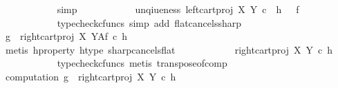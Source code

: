 \begin{isabellebody}
\ \ \ \ \ \ \ \ \ \ \isamarkupfalse%
\ simp\isanewline
\ \ \ \ \ \ \ \ \isamarkupfalse%
\ \isamarkupfalse%
\ unqiueness{}{\isacharcolon}{\kern0pt}\ {\isachardoublequoteopen}{\isacharparenleft}{\kern0pt}left{\isacharunderscore}{\kern0pt}cart{\isacharunderscore}{\kern0pt}proj\ X\ Y{\isacharparenright}{\kern0pt}\ {\isasymcirc}\isactrlsub c\ \ h\isactrlsup {\isasymflat}\ {\isacharequal}{\kern0pt}\ \ f\isactrlsup {\isasymflat}{\isachardoublequoteclose}\isanewline
\ \ \ \ \ \ \ \ \ \ \isamarkupfalse%
\ {\isacharparenleft}{\kern0pt}typecheck{\isacharunderscore}{\kern0pt}cfuncs{\isacharcomma}{\kern0pt}\ simp\ add{\isacharcolon}{\kern0pt}\ flat{\isacharunderscore}{\kern0pt}cancels{\isacharunderscore}{\kern0pt}sharp{\isacharparenright}{\kern0pt}\isanewline
\ \ \ \ \ \ \ \ \isamarkupfalse%
\ {\isachardoublequoteopen}g\ {\isacharequal}{\kern0pt}\ {\isacharparenleft}{\kern0pt}{\isacharparenleft}{\kern0pt}right{\isacharunderscore}{\kern0pt}cart{\isacharunderscore}{\kern0pt}proj\ X\ Y{\isacharparenright}{\kern0pt}\isactrlbsup A\isactrlesup \isactrlsub f{\isacharparenright}{\kern0pt}\ {\isasymcirc}\isactrlsub c\ {\isacharparenleft}{\kern0pt}h\isactrlsup {\isasymflat}{\isacharparenright}{\kern0pt}\isactrlsup {\isasymsharp}{\isachardoublequoteclose}\isanewline
\ \ \ \ \ \ \ \ \ \ \isamarkupfalse%
\ {\isacharparenleft}{\kern0pt}metis\ h{\isacharunderscore}{\kern0pt}property{}\ h{\isacharunderscore}{\kern0pt}type\ sharp{\isacharunderscore}{\kern0pt}cancels{\isacharunderscore}{\kern0pt}flat{\isacharparenright}{\kern0pt}\isanewline
\ \ \ \ \ \ \ \ \isamarkupfalse%
\ {\isachardoublequoteopen}{\isachardot}{\kern0pt}{\isachardot}{\kern0pt}{\isachardot}{\kern0pt}\ {\isacharequal}{\kern0pt}\ {\isacharparenleft}{\kern0pt}{\isacharparenleft}{\kern0pt}right{\isacharunderscore}{\kern0pt}cart{\isacharunderscore}{\kern0pt}proj\ X\ Y{\isacharparenright}{\kern0pt}\ {\isasymcirc}\isactrlsub c\ h\isactrlsup {\isasymflat}{\isacharparenright}{\kern0pt}\isactrlsup {\isasymsharp}{\isachardoublequoteclose}\isanewline
\ \ \ \ \ \ \ \ \ \ \isamarkupfalse%
\ {\isacharparenleft}{\kern0pt}typecheck{\isacharunderscore}{\kern0pt}cfuncs{\isacharcomma}{\kern0pt}\ metis\ transpose{\isacharunderscore}{\kern0pt}of{\isacharunderscore}{\kern0pt}comp{\isacharparenright}{\kern0pt}\isanewline
\ \ \ \ \ \ \ \ \isamarkupfalse%
\ computation{}{\isacharcolon}{\kern0pt}\ {\isachardoublequoteopen}g\ {\isacharequal}{\kern0pt}\ {\isacharparenleft}{\kern0pt}{\isacharparenleft}{\kern0pt}right{\isacharunderscore}{\kern0pt}cart{\isacharunderscore}{\kern0pt}proj\ X\ Y{\isacharparenright}{\kern0pt}\ {\isasymcirc}\isactrlsub c\ h\isactrlsup {\isasymflat}{\isacharparenright}{\kern0pt}\isactrlsup {\isasymsharp}{\isachardoublequoteclose}\isanewline

\end{isabellebody}
